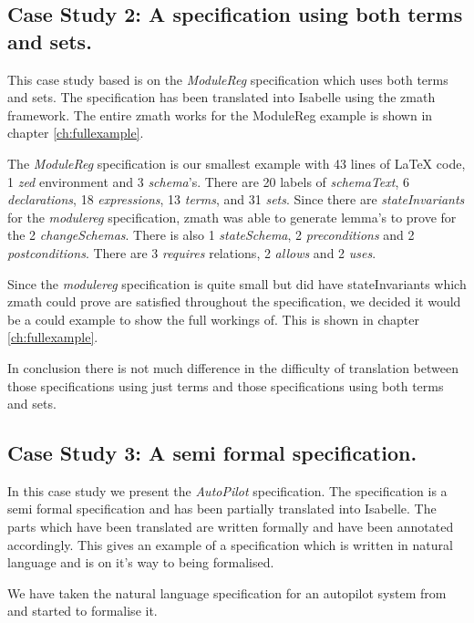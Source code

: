 \subsection{Case Study 2: A specification using both terms and sets.}

This case study based is on the \emph{ModuleReg} specification which uses both
terms and sets. The specification has been translated into Isabelle using the
\gls{zmath} framework. The entire \gls{zmath} works for the ModuleReg example is
shown in chapter \ref{ch:fullexample}.

The \emph{ModuleReg} specification is our smallest example with 43 lines of
\LaTeX{} code, 1 \emph{zed} environment and 3 \emph{schema}'s. There are 20
labels of \emph{schemaText}, 6 \emph{declarations}, 18 \emph{expressions}, 13
\emph{terms}, and 31 \emph{sets}. Since there are \emph{stateInvariants} for the
\emph{modulereg} specification, \gls{zmath} was able to generate lemma's to
prove for the 2 \emph{changeSchemas}. There is also 1 \emph{stateSchema}, 2
\emph{preconditions} and 2 \emph{postconditions}. There are 3 \emph{requires}
relations, 2 \emph{allows} and 2 \emph{uses}.

Since the \emph{modulereg} specification is quite small but did have
stateInvariants which \gls{zmath} could prove are satisfied throughout the
specification, we decided it would be a could example to show the full workings
of. This is shown in chapter \ref{ch:fullexample}.

In conclusion there is not much difference in the difficulty of translation
between those specifications using just terms and those specifications using
both terms and sets.

\subsection{Case Study 3: A semi formal specification.}

In this case study we present the \emph{AutoPilot} specification. The
specification is a semi formal specification and has been partially translated
into Isabelle. The parts which have been translated are written formally and
have been annotated accordingly. This gives an example of a specification which
is written in natural language and is on it's way to being formalised.

We have taken the natural language specification for an autopilot system from
\cite{Butler96} and started to formalise it.

